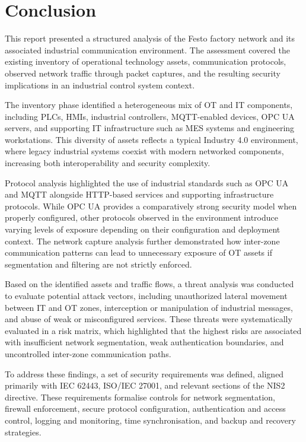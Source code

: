 \section{Conclusion}
This report presented a structured analysis of the Festo factory network and its associated industrial communication environment. The assessment covered the existing inventory of operational technology assets, communication protocols, observed network traffic through packet captures, and the resulting security implications in an industrial control system context.

The inventory phase identified a heterogeneous mix of OT and IT components, including PLCs, HMIs, industrial controllers, MQTT-enabled devices, OPC UA servers, and supporting IT infrastructure such as MES systems and engineering workstations. This diversity of assets reflects a typical Industry 4.0 environment, where legacy industrial systems coexist with modern networked components, increasing both interoperability and security complexity.

Protocol analysis highlighted the use of industrial standards such as OPC UA and MQTT alongside HTTP-based services and supporting infrastructure protocols. While OPC UA provides a comparatively strong security model when properly configured, other protocols observed in the environment introduce varying levels of exposure depending on their configuration and deployment context. The network capture analysis further demonstrated how inter-zone communication patterns can lead to unnecessary exposure of OT assets if segmentation and filtering are not strictly enforced.

Based on the identified assets and traffic flows, a threat analysis was conducted to evaluate potential attack vectors, including unauthorized lateral movement between IT and OT zones, interception or manipulation of industrial messages, and abuse of weak or misconfigured services. These threats were systematically evaluated in a risk matrix, which highlighted that the highest risks are associated with insufficient network segmentation, weak authentication boundaries, and uncontrolled inter-zone communication paths.

To address these findings, a set of security requirements was defined, aligned primarily with IEC 62443, ISO/IEC 27001, and relevant sections of the NIS2 directive. These requirements formalise controls for network segmentation, firewall enforcement, secure protocol configuration, authentication and access control, logging and monitoring, time synchronisation, and backup and recovery strategies.

